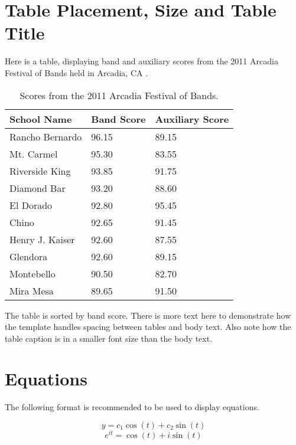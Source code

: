 \section{Table Placement, Size and Table Title}

Here is a table, displaying band and auxiliary scores from the 2011 Arcadia Festival of Bands held in Arcadia, CA \cite{ARCADIA}.

\begin{table}[h!]
	\centering

	\label{Band}
	\begin{tabular}{|l|l|l|}
		\hline
		School Name & Band Score & Auxiliary Score \\ \hline
		Rancho Bernardo & 96.15 & 89.15 \\ \hline
		Mt. Carmel & 95.30 & 83.55 \\ \hline
		Riverside King & 93.85 & 91.75 \\ \hline
		Diamond Bar & 93.20 & 88.60 \\ \hline
		El Dorado & 92.80 & 95.45 \\ \hline
		Chino & 92.65 & 91.45 \\ \hline
		Henry J. Kaiser & 92.60 & 87.55 \\ \hline
		Glendora & 92.60 & 89.15 \\ \hline
		Montebello & 90.50 & 82.70 \\ \hline
		Mira Mesa & 89.65 & 91.50 \\ \hline
	\end{tabular}
	\caption{Scores from the 2011 Arcadia Festival of Bands.}
\end{table}

The table is sorted by band score. There is more text here to demonstrate how the template handles spacing between tables and body text. Also note how the table caption is in a smaller font size than the body text.

\section{Equations}

The following format is recommended to be used to display equations.

\begin{equation} \label{Equ.2.1}
y=c_1\cos(t)+c_2\sin(t)
\end{equation}
\begin{equation} \label{Equ.2.2}
e^{it}=\cos(t)+i\sin(t)
\end{equation}

